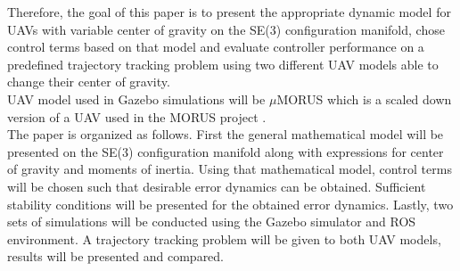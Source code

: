 Therefore, the goal of this paper is to present the appropriate dynamic model for UAVs with variable center of gravity on the SE(3) configuration manifold, chose control terms based on that model and evaluate controller performance on a predefined trajectory tracking problem using two different UAV models able to change their center of gravity. \\
UAV model used in Gazebo simulations will be $\mu$MORUS which is a scaled down version of a UAV used in the MORUS project \cite{MORUSweb}. \\
The paper is organized as follows. First the general mathematical model will be presented on the SE(3) configuration manifold along with expressions for center of gravity and moments of inertia. Using that mathematical model, control terms will be chosen such that desirable error dynamics can be obtained. Sufficient stability conditions will be presented for the obtained error dynamics. Lastly, two sets of simulations will be conducted using the Gazebo simulator and ROS environment. A trajectory tracking problem will be given to both UAV models, results will be presented and compared.
